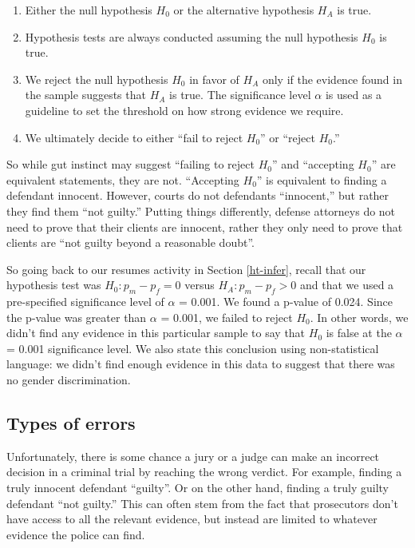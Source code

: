 \documentclass[
]{book}
\providecommand{\tightlist}{%
  \setlength{\itemsep}{0pt}\setlength{\parskip}{0pt}}
\begin{document}
\begin{enumerate}
\def\labelenumi{\arabic{enumi}.}
\tightlist
\item
  Either the null hypothesis \(H_0\) or the alternative hypothesis \(H_A\) is true.
\item
  Hypothesis tests are always conducted assuming the null hypothesis \(H_0\) is true.
\item
  We reject the null hypothesis \(H_0\) in favor of \(H_A\) only if the evidence found in the sample suggests that \(H_A\) is true. The significance level \(\alpha\) is used as a guideline to set the threshold on how strong evidence we require.
\item
  We ultimately decide to either ``fail to reject \(H_0\)'' or ``reject \(H_0\).''
\end{enumerate}

So while gut instinct may suggest ``failing to reject \(H_0\)'' and ``accepting \(H_0\)'' are equivalent statements, they are not. ``Accepting \(H_0\)'' is equivalent to finding a defendant innocent. However, courts do not defendants ``innocent,'' but rather they find them ``not guilty.'' Putting things differently, defense attorneys do not need to prove that their clients are innocent, rather they only need to prove that clients are ``not guilty beyond a reasonable doubt''.

So going back to our resumes activity in Section \ref{ht-infer}, recall that our hypothesis test was \(H_0: p_{m} - p_{f} = 0\) versus \(H_A: p_{m} - p_{f} > 0\) and that we used a pre-specified significance level of \(\alpha\) = 0.001. We found a p-value of 0.024. Since the p-value was greater than \(\alpha\) = 0.001, we failed to reject \(H_0\). In other words, we didn't find any evidence in this particular sample to say that \(H_0\) is false at the \(\alpha\) = 0.001 significance level. We also state this conclusion using non-statistical language: we didn't find enough evidence in this data to suggest that there was no gender discrimination.

\hypertarget{types-of-errors}{%
\subsection{Types of errors}\label{types-of-errors}}

Unfortunately, there is some chance a jury or a judge can make an incorrect decision in a criminal trial by reaching the wrong verdict. For example, finding a truly innocent defendant ``guilty''. Or on the other hand, finding a truly guilty defendant ``not guilty.'' This can often stem from the fact that prosecutors don't have access to all the relevant evidence, but instead are limited to whatever evidence the police can find.
\end{document}
